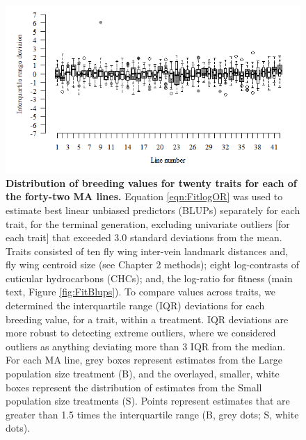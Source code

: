 \FloatBarrier
\begin{figure}[!hb]
    \centering
    \includegraphics[width=1\textwidth]{Supp/Chp4_DNA/MultiBreedingVals.png}
\caption[Distribution of breeding values for twenty traits for each of the forty-two MA lines. ]{\textbf{Distribution of breeding values for twenty traits for each of the forty-two MA lines.} Equation \ref{eqn:FitlogOR} was used to estimate best linear unbiased predictors (BLUPs) separately for each trait, for the terminal generation, excluding univariate outliers [for each trait] that exceeded 3.0 standard deviations from the mean. Traits consisted of ten fly wing inter-vein landmark distances and, fly wing centroid size (see Chapter 2 methods); eight log-contrasts of cuticular hydrocarbons (CHCs); and, the log-ratio for fitness (main text, Figure \ref{fig:FitBlups}). To compare values across traits, we determined the interquartile range (IQR) deviations for each breeding value, for a trait, within a treatment. IQR deviations are more robust to detecting extreme outliers, where we considered outliers as anything deviating more than 3 IQR from the median. For each MA line, grey boxes represent estimates from the Large population size treatment (B), and the overlayed, smaller, white boxes represent the distribution of estimates from the Small population size treatments (S). Points represent estimates that are greater than 1.5 times the interquartile range (B, grey dots; S, white dots). }
    \label{fig:DNAsuppBlups}
\end{figure}

\FloatBarrier

